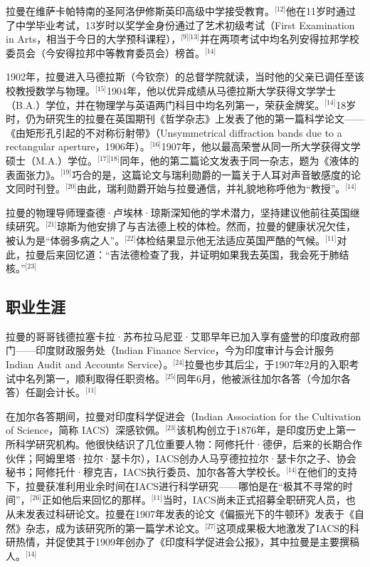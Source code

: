 拉曼在维萨卡帕特南的圣阿洛伊修斯英印高级中学接受教育。\(^\text{[12]}\)他在11岁时通过了中学毕业考试，13岁时以奖学金身份通过了艺术初级考试（First Examination in Arts，相当于今日的大学预科课程），\(^\text{[9][13]}\)并在两项考试中均名列安得拉邦学校委员会（今安得拉邦中等教育委员会）榜首。\(^\text{[14]}\)

1902年，拉曼进入马德拉斯（今钦奈）的总督学院就读，当时他的父亲已调任至该校教授数学与物理。\(^\text{[15]}\)1904年，他以优异成绩从马德拉斯大学获得文学学士（B.A.）学位，并在物理学与英语两门科目中均名列第一，荣获金牌奖。\(^\text{[14]}\)18岁时，仍为研究生的拉曼在英国期刊《哲学杂志》上发表了他的第一篇科学论文——《由矩形孔引起的不对称衍射带》（Unsymmetrical diffraction bands due to a rectangular aperture，1906年）。\(^\text{[16]}\)1907年，他以最高荣誉从同一所大学获得文学硕士（M.A.）学位。\(^\text{[17][18]}\)同年，他的第二篇论文发表于同一杂志，题为《液体的表面张力》。\(^\text{[19]}\)巧合的是，这篇论文与瑞利勋爵的一篇关于人耳对声音敏感度的论文同时刊登。\(^\text{[20]}\)由此，瑞利勋爵开始与拉曼通信，并礼貌地称呼他为“教授”。\(^\text{[14]}\)

拉曼的物理导师理查德·卢埃林·琼斯深知他的学术潜力，坚持建议他前往英国继续研究。\(^\text{[21]}\)琼斯为他安排了与吉法德上校的体检。然而，拉曼的健康状况欠佳，被认为是“体弱多病之人”。\(^\text{[22]}\)体检结果显示他无法适应英国严酷的气候。\(^\text{[11]}\)对此，拉曼后来回忆道：“吉法德检查了我，并证明如果我去英国，我会死于肺结核。”\(^\text{[23]}\)
\subsection{职业生涯}
拉曼的哥哥钱德拉塞卡拉·苏布拉马尼亚·艾耶早年已加入享有盛誉的印度政府部门——印度财政服务处（Indian Finance Service，今为印度审计与会计服务 Indian Audit and Accounts Service）。\(^\text{[24]}\)拉曼也步其后尘，于1907年2月的入职考试中名列第一，顺利取得任职资格。\(^\text{[25]}\)同年6月，他被派往加尔各答（今加尔各答）任副会计长。\(^\text{[11]}\)

在加尔各答期间，拉曼对印度科学促进会（Indian Association for the Cultivation of Science，简称 IACS）深感钦佩。\(^\text{[23]}\)该机构创立于1876年，是印度历史上第一所科学研究机构。他很快结识了几位重要人物：阿修托什·德伊，后来的长期合作伙伴；阿姆里塔·拉尔·瑟卡尔），IACS创办人马亨德拉拉尔·瑟卡尔之子、协会秘书；阿修托什·穆克吉，IACS执行委员、加尔各答大学校长。\(^\text{[14]}\)在他们的支持下，拉曼获准利用业余时间在IACS进行科学研究——哪怕是在“极其不寻常的时间”，\(^\text{[26]}\)正如他后来回忆的那样。\(^\text{[11]}\)当时，IACS尚未正式招募全职研究人员，也从未发表过科研论文。拉曼在1907年发表的论文《偏振光下的牛顿环》发表于《自然》杂志，成为该研究所的第一篇学术论文。\(^\text{[27]}\)这项成果极大地激发了IACS的科研热情，并促使其于1909年创办了《印度科学促进会公报》，其中拉曼是主要撰稿人。\(^\text{[14]}\)

